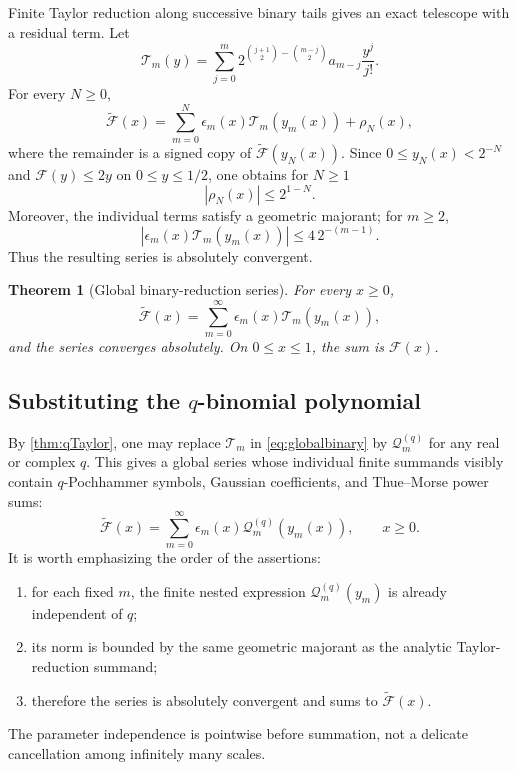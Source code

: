\documentclass[11pt,oneside]{article}
\newtheorem{theorem}{Theorem}[section]
\theoremstyle{definition}
\theoremstyle{remark}
\newcommand{\F}{\mathcal F}
\newcommand{\G}{\widetilde{\mathcal F}}
\begin{document}
Finite Taylor reduction along successive binary tails gives an exact
telescope with a residual term.  Let
\begin{equation}\label{eq:Tmdef}
 \mathcal T_m(y)=
 \sum_{j=0}^{m}
 2^{\binom{j+1}{2}-\binom{m-j}{2}}
 a_{m-j}\frac{y^j}{j!}.
\end{equation}
For every $N\ge0$,
\begin{equation}\label{eq:finitetelescope}
 \G(x)=
 \sum_{m=0}^{N}\epsilon_m(x)\mathcal T_m(y_m(x))
 +\rho_N(x),
\end{equation}
where the remainder is a signed copy of $\G(y_N(x))$.  Since
$0\le y_N(x)<2^{-N}$ and $\F(y)\le2y$ on $0\le y\le1/2$, one obtains for
$N\ge1$
\begin{equation}\label{eq:remainderbound}
 |\rho_N(x)|\le2^{1-N}.
\end{equation}
Moreover, the individual terms satisfy a geometric majorant; for $m\ge2$,
\begin{equation}\label{eq:summandbound}
 \left|\epsilon_m(x)\mathcal T_m(y_m(x))\right|
 \le4\,2^{-(m-1)}.
\end{equation}
Thus the resulting series is absolutely convergent.

\begin{theorem}[Global binary-reduction series]\label{thm:globalbinary}
For every $x\ge0$,
\begin{equation}\label{eq:globalbinary}
 \boxed{
 \G(x)=\sum_{m=0}^{\infty}
 \epsilon_m(x)\mathcal T_m(y_m(x)),}
\end{equation}
and the series converges absolutely.  On $0\le x\le1$, the sum is
$\F(x)$.
\end{theorem}

\subsection{Substituting the \texorpdfstring{$q$-binomial polynomial}{q-binomial polynomial}}

By \cref{thm:qTaylor}, one may replace $\mathcal T_m$ in
\eqref{eq:globalbinary} by $\mathcal Q_m^{(q)}$ for any real or complex
$q$.  This gives a global series whose individual finite summands visibly
contain $q$-Pochhammer symbols, Gaussian coefficients, and Thue--Morse power
sums:
\begin{equation}\label{eq:globalqcompact}
 \boxed{
 \G(x)=\sum_{m=0}^{\infty}
 \epsilon_m(x)\mathcal Q_m^{(q)}(y_m(x)),
 \qquad x\ge0.}
\end{equation}
It is worth emphasizing the order of the assertions:
\begin{enumerate}[leftmargin=2.2em]
\item for each fixed $m$, the finite nested expression
$\mathcal Q_m^{(q)}(y_m)$ is already independent of $q$;
\item its norm is bounded by the same geometric majorant as the analytic
Taylor-reduction summand;
\item therefore the series is absolutely convergent and sums to $\G(x)$.
\end{enumerate}
The parameter independence is pointwise before summation, not a delicate
cancellation among infinitely many scales.
\end{document}
